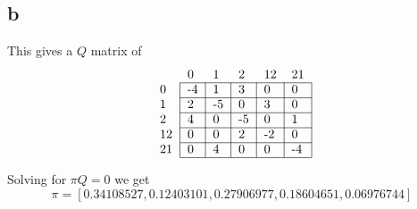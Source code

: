 \documentclass{article}
\begin{document}
\subsection*{b}
This gives a $Q$ matrix of
$$
\begin{tabular}{llllll}
                        & 0                       & 1                       & 2                       & 12                      & 21                      \\ \cline{2-6} 
\multicolumn{1}{l|}{0}  & \multicolumn{1}{l|}{-4} & \multicolumn{1}{l|}{1}  & \multicolumn{1}{l|}{3}  & \multicolumn{1}{l|}{0}  & \multicolumn{1}{l|}{0}  \\ \cline{2-6} 
\multicolumn{1}{l|}{1}  & \multicolumn{1}{l|}{2}  & \multicolumn{1}{l|}{-5} & \multicolumn{1}{l|}{0}  & \multicolumn{1}{l|}{3}  & \multicolumn{1}{l|}{0}  \\ \cline{2-6} 
\multicolumn{1}{l|}{2}  & \multicolumn{1}{l|}{4}  & \multicolumn{1}{l|}{0}  & \multicolumn{1}{l|}{-5} & \multicolumn{1}{l|}{0}  & \multicolumn{1}{l|}{1}  \\ \cline{2-6} 
\multicolumn{1}{l|}{12} & \multicolumn{1}{l|}{0}  & \multicolumn{1}{l|}{0}  & \multicolumn{1}{l|}{2}  & \multicolumn{1}{l|}{-2} & \multicolumn{1}{l|}{0}  \\ \cline{2-6} 
\multicolumn{1}{l|}{21} & \multicolumn{1}{l|}{0}  & \multicolumn{1}{l|}{4}  & \multicolumn{1}{l|}{0}  & \multicolumn{1}{l|}{0}  & \multicolumn{1}{l|}{-4} \\ \cline{2-6} 
\end{tabular}
$$

Solving for $\pi Q = 0$
we get
$$
\pi = [ 0.34108527,  0.12403101,  0.27906977,  0.18604651,  0.06976744]
$$
\end{document}
